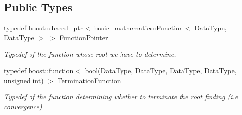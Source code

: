 \subsection*{Public Types}
\begin{DoxyCompactItemize}
\item 
typedef boost\+::shared\+\_\+ptr$<$ \hyperlink{classtudat_1_1basic__mathematics_1_1Function}{basic\+\_\+mathematics\+::\+Function}$<$ Data\+Type, Data\+Type $>$ $>$ \hyperlink{classtudat_1_1root__finders_1_1RootFinderCore_af0bb889d21fa3bc55785021381d3b4b5}{Function\+Pointer}\hypertarget{classtudat_1_1root__finders_1_1RootFinderCore_af0bb889d21fa3bc55785021381d3b4b5}{}\label{classtudat_1_1root__finders_1_1RootFinderCore_af0bb889d21fa3bc55785021381d3b4b5}

\begin{DoxyCompactList}\small\item\em Typedef of the function whose root we have to determine. \end{DoxyCompactList}\item 
typedef boost\+::function$<$ bool(Data\+Type, Data\+Type, Data\+Type, Data\+Type, unsigned int) $>$ \hyperlink{classtudat_1_1root__finders_1_1RootFinderCore_a8dd4dc4316b5e984e279816e0a2b67d5}{Termination\+Function}\hypertarget{classtudat_1_1root__finders_1_1RootFinderCore_a8dd4dc4316b5e984e279816e0a2b67d5}{}\label{classtudat_1_1root__finders_1_1RootFinderCore_a8dd4dc4316b5e984e279816e0a2b67d5}

\begin{DoxyCompactList}\small\item\em Typedef of the function determining whether to terminate the root finding (i.\+e convergence) \end{DoxyCompactList}\end{DoxyCompactItemize}
